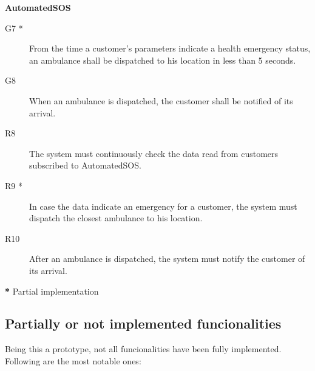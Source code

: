 \documentclass[../main.tex]{subfiles}
\begin{document}
\vspace{8mm}


	{\bf AutomatedSOS}

	\vspace{0.5cm}

	\begin{description}
		\item [G7 *]  From the time a customer's parameters indicate a health emergency status, an ambulance shall be dispatched to his location in less than 5 seconds.
		\item [G8]  When an ambulance is dispatched, the customer shall be notified of its arrival.

		\item [R8] The system must continuously check the data read from customers subscribed to AutomatedSOS.
		\item [R9 *] In case the data indicate an emergency for a customer, the system must dispatch the closest ambulance to his location.
		\item [R10] After an ambulance is dispatched, the system must notify the customer of its arrival.

	\end{description}


\textbf{*} Partial implementation

\subsection{Partially or not implemented funcionalities}

Being this a prototype, not all funcionalities have been fully implemented. Following are the most notable ones:
\end{document}
